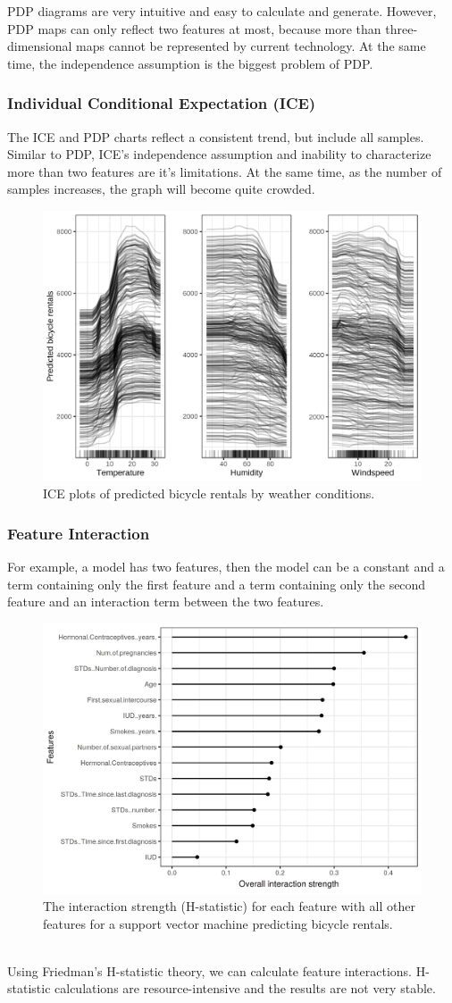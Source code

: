 PDP diagrams are very intuitive and easy to calculate and generate. However, PDP maps can only reflect two features at most, because more than three-dimensional maps cannot be represented by current technology. At the same time, the independence assumption is the biggest problem of PDP.

\subsubsection{Individual Conditional Expectation (ICE)}
The ICE and PDP charts reflect a consistent trend, but include all samples. Similar to PDP, ICE's independence assumption and inability to characterize more than two features are it's limitations. At the same time, as the number of samples increases, the graph will become quite crowded.
\begin{figure}[H]
\centering
\includegraphics[width=0.6\columnwidth]{gfx/ice-bike-1.png}
\caption{ ICE plots of predicted bicycle rentals by weather conditions.~\cite{molnar2019}}
\label{fig:ice-bike}
\end{figure}

\subsubsection{Feature Interaction}
For example, a model has two features, then the model can be a constant and a term containing only the first feature and a term containing only the second feature and an interaction term between the two features. 
\begin{figure}[H]
\centering
\includegraphics[width=0.6\columnwidth]{gfx/interaction-cervical-1.png}
\caption{The interaction strength (H-statistic) for each feature with all other features for a support vector machine predicting bicycle rentals.~\cite{molnar2019}}
\label{fig:interaction}
\end{figure}
~\\Using Friedman's H-statistic theory, we can calculate feature interactions. H-statistic calculations are resource-intensive and the results are not very stable.

